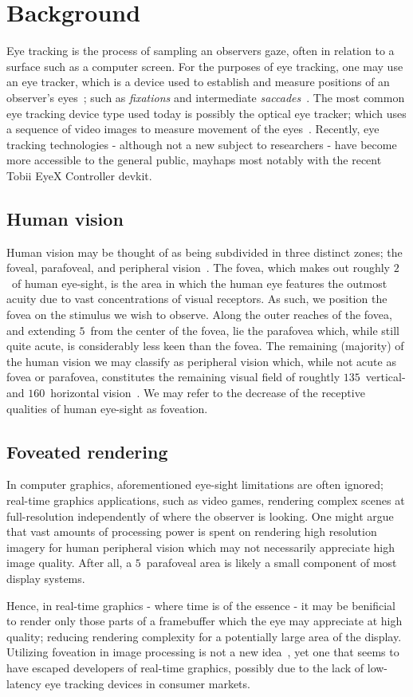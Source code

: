 \section{Background}
Eye tracking is the process of sampling an observers gaze, often in relation to a surface such as a computer screen.
For the purposes of eye tracking, one may use an eye tracker, which is a device used to establish and measure positions of an observer's eyes~\cite{duchowski07}; such as \textit{fixations} and intermediate \textit{saccades}~\cite{rayner98}.
The most common eye tracking device type used today is possibly the optical eye tracker; which uses a sequence of video images to measure movement of the eyes~\cite{duchowski07}.
Recently, eye tracking technologies - although not a new subject to researchers - have become more accessible to the general public, mayhaps most notably with the recent Tobii EyeX Controller devkit.

\subsection{Human vision}
Human vision may be thought of as being subdivided in three distinct zones; the foveal, parafoveal, and peripheral vision~\cite{rayner98}.
The fovea, which makes out roughly $2$\degree\ of human eye-sight, is the area in which the human eye features the outmost acuity due to vast concentrations of visual receptors.
As such, we position the fovea on the stimulus we wish to observe.
Along the outer reaches of the fovea, and extending $5$\degree\ from the center of the fovea, lie the parafovea which, while still quite acute, is considerably less keen than the fovea.
The remaining (majority) of the human vision we may classify as peripheral vision which, while not acute as fovea or parafovea, constitutes the remaining visual field of roughtly $135$\degree\ vertical- and $160$\degree\ horizontal vision~\cite{guenter12}.
We may refer to the decrease of the receptive qualities of human eye-sight as foveation.

\subsection{Foveated rendering}
In computer graphics, aforementioned eye-sight limitations are often ignored; real-time graphics applications, such as video games, rendering complex scenes at full-resolution independently of where the observer is looking.
One might argue that vast amounts of processing power is spent on rendering high resolution imagery for human peripheral vision which may not necessarily appreciate high image quality.
After all, a $5$\degree\ parafoveal area is likely a small component of most display systems.

Hence, in real-time graphics - where time is of the essence - it may be benificial to render only those parts of a framebuffer which the eye may appreciate at high quality; reducing rendering complexity for a potentially large area of the display.
Utilizing foveation in image processing is not a new idea~\cite{levoy90}, yet one that seems to have escaped developers of real-time graphics, possibly due to the lack of low-latency eye tracking devices in consumer markets.

